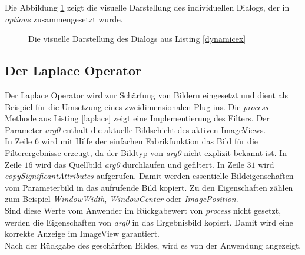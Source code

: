 Die Abbildung \ref{dialog_example} zeigt die visuelle Darstellung des individuellen Dialogs, der in \textit{options} zusammengesetzt wurde. 

\begin{figure}[htbp]
  \vspace{0.5cm}
  \centering
   \caption{Die visuelle Darstellung des Dialogs aus Listing \ref{dynamicex}}
  \label{dialog_example}
  \vspace{0.5cm}
\end{figure}

\FloatBarrier
\subsection{Der Laplace Operator}

Der Laplace Operator wird zur Schärfung von Bildern eingesetzt und dient als Beispiel für die Umsetzung eines zweidimensionalen Plug-ins. Die \textit{process}-Methode aus Listing \ref{laplace} zeigt eine Implementierung des Filters. Der Parameter \textit{arg0} enthalt die aktuelle Bildschicht des aktiven ImageViews.\\
In Zeile $6$ wird mit Hilfe der einfachen Fabrikfunktion das Bild für die Filterergebnisse erzeugt, da der Bildtyp von \textit{arg0} nicht explizit bekannt ist. In Zeile $16$ wird das Quellbild \textit{arg0} durchlaufen und gefiltert. In Zeile $31$ wird \textit{copySignificantAttributes} aufgerufen. Damit werden essentielle Bildeigenschaften vom Parameterbild in das aufrufende Bild kopiert. Zu den Eigenschaften zählen zum Beispiel \textit{WindowWidth}, \textit{WindowCenter} oder \textit{ImagePosition}.\\
Sind diese Werte vom Anwender im Rückgabewert von \textit{process} nicht gesetzt, werden die Eigenschaften von \textit{arg0} in das Ergebnisbild kopiert. Damit wird eine korrekte Anzeige im ImageView garantiert.\\
Nach der Rückgabe des geschärften Bildes, wird es von der Anwendung angezeigt.

